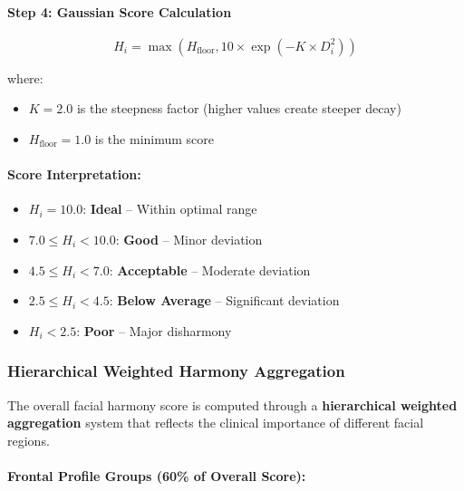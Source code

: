 \paragraph{Step 4: Gaussian Score Calculation}
\begin{equation}
H_i = \max\left(H_{\text{floor}}, 10 \times \exp(-K \times D_i^2)\right)
\end{equation}

where:
\begin{itemize}
    \item $K = 2.0$ is the steepness factor (higher values create steeper decay)
    \item $H_{\text{floor}} = 1.0$ is the minimum score
\end{itemize}

\paragraph{Score Interpretation:}
\begin{itemize}
    \item $H_i = 10.0$: \textbf{Ideal} -- Within optimal range
    \item $7.0 \leq H_i < 10.0$: \textbf{Good} -- Minor deviation
    \item $4.5 \leq H_i < 7.0$: \textbf{Acceptable} -- Moderate deviation
    \item $2.5 \leq H_i < 4.5$: \textbf{Below Average} -- Significant deviation
    \item $H_i < 2.5$: \textbf{Poor} -- Major disharmony
\end{itemize}

\subsubsection{Hierarchical Weighted Harmony Aggregation}

The overall facial harmony score is computed through a \textbf{hierarchical weighted aggregation} system that reflects the clinical importance of different facial regions.

\paragraph{Frontal Profile Groups (60\% of Overall Score):}

